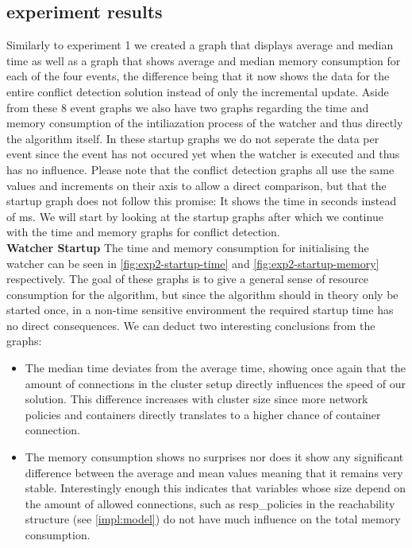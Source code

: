 \subsection{experiment results} \label{exp2:results}
Similarly to experiment 1 we created a graph that displays average and median time as well as a graph that shows average and median memory consumption for each of the four events, the difference being that it now shows the data for the entire conflict detection solution instead of only the incremental update. Aside from these 8 event graphs we also have two graphs regarding the time and memory consumption of the intiliazation process of the watcher and thus directly the algorithm itself. In these startup graphs we do not seperate the data per event since the event has not occured yet when the watcher is executed and thus has no influence. Please note that the conflict detection graphs all use the same values and increments on their axis to allow a direct comparison, but that the startup graph does not follow this promise: It shows the time in seconds instead of ms. We will start by looking at the startup graphs after which we continue with the time and memory graphs for conflict detection.
\\[10pt]

\textbf{Watcher Startup}
\newline The time and memory consumption for initialising the watcher can be seen in \autoref{fig:exp2-startup-time} and \autoref{fig:exp2-startup-memory} respectively. The goal of these graphs is to give a general sense of resource consumption for the algorithm, but since the algorithm should in theory only be started once, in a non-time sensitive environment the required startup time has no direct consequences. We can deduct two interesting conclusions from the graphs:

\begin{itemize}
    	\item The median time deviates from the average time, showing once again that the amount of connections in the cluster setup directly influences the speed of our solution. This difference increases with cluster size since more network policies and containers directly translates to a higher chance of container connection.
	\item The memory consumption shows no surprises nor does it show any significant difference between the average and mean values meaning that it remains very stable. Interestingly enough this indicates that variables whose size depend on the amount of allowed connections, such as resp\_policies  in the reachability structure (see \autoref{impl:model}) do not have much influence on the total memory consumption.

\end{itemize}

